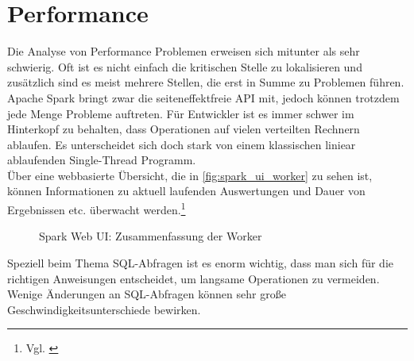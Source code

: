 \newpage
\section{Performance}
Die Analyse von Performance Problemen erweisen sich mitunter als sehr schwierig. Oft ist es nicht einfach die kritischen Stelle zu lokalisieren und zusätzlich sind es meist mehrere Stellen, die erst in Summe zu Problemen führen. Apache Spark bringt zwar die seiteneffektfreie API mit, jedoch können trotzdem jede Menge Probleme auftreten. Für Entwickler ist es immer schwer im Hinterkopf zu behalten, dass Operationen auf vielen verteilten Rechnern ablaufen. Es unterscheidet sich doch stark von einem klassischen liniear ablaufenden Single-Thread Programm.\\ 

\noindent
Über eine webbasierte Übersicht, die in \autoref{fig:spark_ui_worker} zu sehen ist, können Informationen zu aktuell laufenden Auswertungen und Dauer von Ergebnissen etc. überwacht werden.\footnote{Vgl. \cite[12]{AAWS15}}

\begin{figure}[h]
  \centering
  \caption{Spark Web UI: Zusammenfassung der Worker}\label{fig:spark_ui_worker}
\end{figure}

\noindent
Speziell beim Thema SQL-Abfragen ist es enorm wichtig, dass man sich für die richtigen Anweisungen entscheidet, um langsame Operationen zu vermeiden. 
Wenige Änderungen an SQL-Abfragen können sehr große Geschwindigkeitsunterschiede bewirken.



